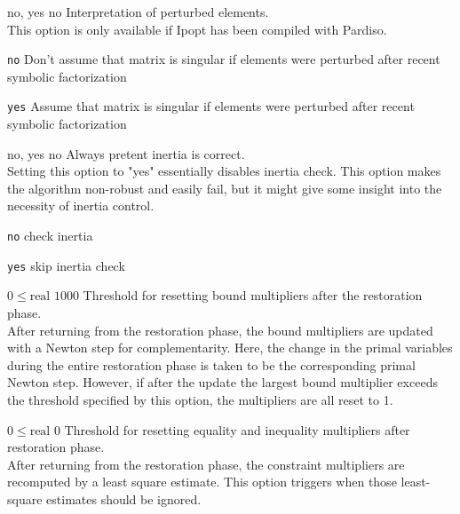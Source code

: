 %
{no, yes}%
{no}%
{Interpretation of perturbed elements.\\
This option is only available if Ipopt has been compiled with Pardiso.}%
{\begin{list}{}{
\setlength{\parsep}{0em}
\setlength{\leftmargin}{5ex}
\setlength{\labelwidth}{2ex}
\setlength{\itemindent}{0ex}
\setlength{\topsep}{0pt}}
\item[\texttt{no}] Don't assume that matrix is singular if elements were perturbed after recent symbolic factorization
\item[\texttt{yes}] Assume that matrix is singular if elements were perturbed after recent symbolic factorization
\end{list}
}

%
{no, yes}%
{no}%
{Always pretent inertia is correct.\\
Setting this option to "yes" essentially disables inertia check. This option makes the algorithm non-robust and easily fail, but it might give some insight into the necessity of inertia control.}%
{\begin{list}{}{
\setlength{\parsep}{0em}
\setlength{\leftmargin}{5ex}
\setlength{\labelwidth}{2ex}
\setlength{\itemindent}{0ex}
\setlength{\topsep}{0pt}}
\item[\texttt{no}] check inertia
\item[\texttt{yes}] skip inertia check
\end{list}
}

%
{$0\leq\textrm{real}$}%
{$1000$}%
{Threshold for resetting bound multipliers after the restoration phase.\\
After returning from the restoration phase, the bound multipliers are updated with a Newton step for complementarity.  Here, the change in the primal variables during the entire restoration phase is taken to be the corresponding primal Newton step. However, if after the update the largest bound multiplier exceeds the threshold specified by this option, the multipliers are all reset to 1.}%
{}

%
{$0\leq\textrm{real}$}%
{$0$}%
{Threshold for resetting equality and inequality multipliers after restoration phase.\\
After returning from the restoration phase, the constraint multipliers are recomputed by a least square estimate.  This option triggers when those least-square estimates should be ignored.}%
{}

